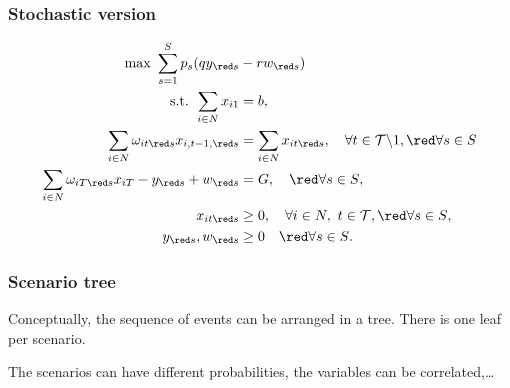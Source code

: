 \documentclass{beamer}
\begin{document}
\begin{frame}
\frametitle{Stochastic version}

\begin{align*}
\max\ \sum_{s=1}^S p_s(qy_{\red s} & - rw_{\red s})\\
\mbox{s.t. } \sum_{i \in N} x_{i1} & = b,\\
\sum_{i \in N} \omega_{it{\red s}}x_{i,t-1,{\red s}} & = \sum_{i \in
  N} x_{it{\red s}}, \quad \forall t \in \mathcal{T} \backslash 1,
{\red \forall s \in S} \\
\sum_{i \in N} \omega_{iT{\red s}}x_{iT} - y_{\red s} + w_{\red s} & = G,
\quad {\red \forall s \in S}, \\
x_{it{\red s}} & \geq 0, \quad \forall i \in N,\ t \in \mathcal{T},
{\red \forall s \in S},\\
y_{\red s}, w_{\red s} & \geq 0 \quad {\red \forall s \in S}.
\end{align*}

\end{frame}

\begin{frame}
\frametitle{Scenario tree}

Conceptually, the sequence of events can be arranged in a tree.
There is one leaf per scenario.
\begin{center}
\end{center}

The scenarios can have different probabilities, the variables can be correlated,\ldots

\end{frame}
\end{document}
